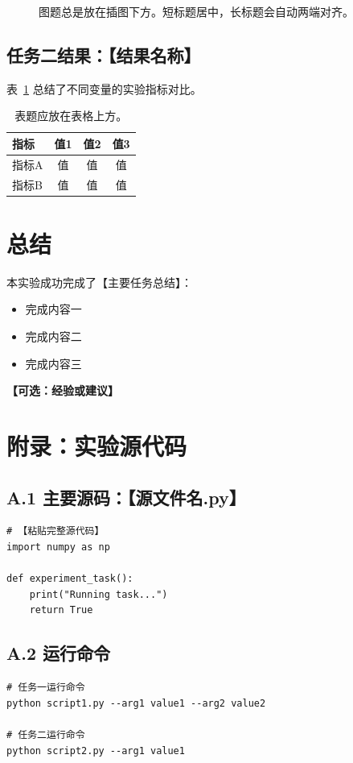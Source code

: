 \documentclass[runningheads]{ctexart}
\begin{document}
\begin{figure}[H]
    \centering
    \caption{图题总是放在插图下方。短标题居中，长标题会自动两端对齐。}
    \label{fig:task1}
\end{figure}

\subsection{任务二结果：【结果名称】}
表~\ref{tab:task2} 总结了不同变量的实验指标对比。

\begin{table}[H]
    \centering
    \caption{表题应放在表格上方。}\label{tab:task2}
    \begin{tabular}{lccc}
        \toprule
        指标 & 值1 & 值2 & 值3 \\
        \midrule
        指标A & 值 & 值 & 值 \\
        指标B & 值 & 值 & 值 \\
        \bottomrule
    \end{tabular}
\end{table}


\section{总结}
本实验成功完成了【主要任务总结】：
\begin{itemize}
    \item 完成内容一
    \item 完成内容二
    \item 完成内容三
\end{itemize}
\textbf{【可选：经验或建议】}


\section*{附录：实验源代码}
\subsection*{A.1 主要源码：【源文件名.py】}
\begin{lstlisting}
# 【粘贴完整源代码】
import numpy as np

def experiment_task():
    print("Running task...")
    return True
\end{lstlisting}

\subsection*{A.2 运行命令}
\begin{verbatim}
# 任务一运行命令
python script1.py --arg1 value1 --arg2 value2

# 任务二运行命令
python script2.py --arg1 value1
\end{verbatim}
\end{document}

